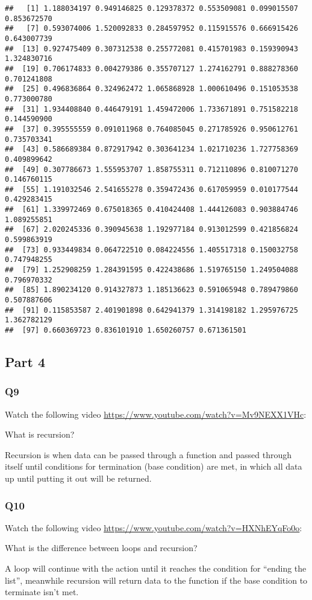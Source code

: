 \documentclass[
]{article}
\begin{document}
\begin{verbatim}
##   [1] 1.188034197 0.949146825 0.129378372 0.553509081 0.099015507 0.853672570
##   [7] 0.593074006 1.520092833 0.284597952 0.115915576 0.666915426 0.643007739
##  [13] 0.927475409 0.307312538 0.255772081 0.415701983 0.159390943 1.324830716
##  [19] 0.706174833 0.004279386 0.355707127 1.274162791 0.888278360 0.701241808
##  [25] 0.496836864 0.324962472 1.065868928 1.000610496 0.151053538 0.773000780
##  [31] 1.934408840 0.446479191 1.459472006 1.733671891 0.751582218 0.144590900
##  [37] 0.395555559 0.091011968 0.764085045 0.271785926 0.950612761 0.735703341
##  [43] 0.586689384 0.872917942 0.303641234 1.021710236 1.727758369 0.409899642
##  [49] 0.307786673 1.555953707 1.858755311 0.712110896 0.810071270 0.146760115
##  [55] 1.191032546 2.541655278 0.359472436 0.617059959 0.010177544 0.429283415
##  [61] 1.339972469 0.675018365 0.410424408 1.444126083 0.903884746 1.089255851
##  [67] 2.020245336 0.390945638 1.192977184 0.913012599 0.421856824 0.599863919
##  [73] 0.933449834 0.064722510 0.084224556 1.405517318 0.150032758 0.747948255
##  [79] 1.252908259 1.284391595 0.422438686 1.519765150 1.249504088 0.796970332
##  [85] 1.890234120 0.914327873 1.185136623 0.591065948 0.789479860 0.507887606
##  [91] 0.115853587 2.401901898 0.642941379 1.314198182 1.295976725 1.362782129
##  [97] 0.660369723 0.836101910 1.650260757 0.671361501
\end{verbatim}

\hypertarget{part-4}{%
\subsection{Part 4}\label{part-4}}

\hypertarget{q9}{%
\subsubsection{Q9}\label{q9}}

Watch the following video
\url{https://www.youtube.com/watch?v=Mv9NEXX1VHc}:

What is recursion?

Recursion is when data can be passed through a function and passed
through itself until conditions for termination (base condition) are
met, in which all data up until putting it out will be returned.

\hypertarget{q10}{%
\subsubsection{Q10}\label{q10}}

Watch the following video
\url{https://www.youtube.com/watch?v=HXNhEYqFo0o}:

What is the difference between loops and recursion?

A loop will continue with the action until it reaches the condition for
``ending the list'', meanwhile recursion will return data to the
function if the base condition to terminate isn't met.
\end{document}
